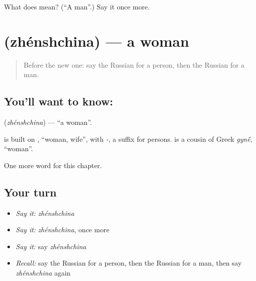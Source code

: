 \begin{tcolorbox}[breakable,colback=teal!4,colframe=teal!35!black,title={Before you move on}]
What does  mean? (\textquotedblleft{}A man\textquotedblright{}.) Say it once more.
\end{tcolorbox}
\section[\texorpdfstring{\ru{женщина} (zhénshchina)}{женщина (zhénshchina)}]{ (zhénshchina) — a woman}

\label{lesson:RU-C227-zhenshchina}



\begin{quote}
Before the new one: say the Russian for a person, then the Russian for a man.
\end{quote}

\subsection*{You'll want to know: }
\textbf{} (\emph{zhénshchina}) — \textquotedblleft{}a woman\textquotedblright{}.

\begin{cousinweb}
\textbf{} is built on \emph{}, \textquotedblleft{}woman, wife\textquotedblright{}, with \emph{-}, a suffix for persons. \emph{} is a cousin of Greek \emph{gyn\'{\={e}}}, \textquotedblleft{}woman\textquotedblright{}.
\end{cousinweb}

\begin{grammarlens}[title={What you've built}]
One more word for this chapter.
\end{grammarlens}

\subsection*{Your turn}
\begin{itemize}
\raggedright
  \item \emph{Say it:} \emph{zhénshchina}
  \item \emph{Say it:} \emph{zhénshchina}, once more
  \item \emph{Say it:} say \emph{zhénshchina}
  \item \emph{Recall:} say the Russian for a person, then the Russian for a man, then say \emph{zhénshchina} again
\end{itemize}


